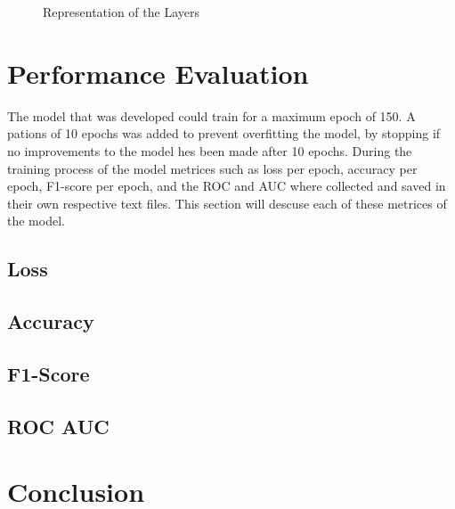 \documentclass[a4paper,oneside,11pt]{book}
\begin{document}
\begin{figure}[h]
    \centering
    \caption{Representation of the Layers}
\end{figure}

\chapter[Performance Evaluation]{Performance Evaluation}

The model that was developed could train for a maximum epoch of 150. A pations of 10 epochs was added to prevent overfitting the model, by stopping if no improvements to the model hes been made after 10 epochs. During the training process of the model metrices such as loss per epoch, accuracy per epoch, F1-score per epoch, and the ROC and AUC where collected and saved in their own respective text files. This section will descuse each of these metrices of the model.

\section{Loss}

\section{Accuracy}

\section{F1-Score}

\section{ROC AUC}

\chapter[Conclusion]{Conclusion}


\end{document}
